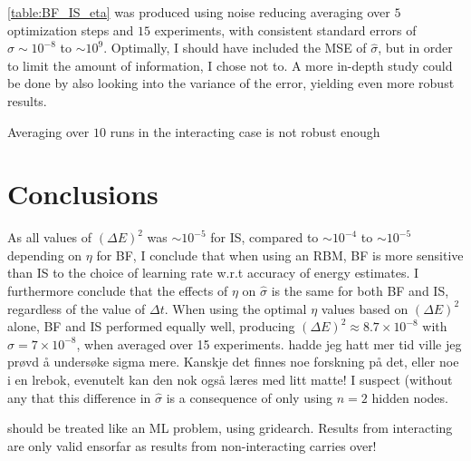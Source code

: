 \documentclass[%
oneside,                 %
final,                   %
10pt]{article}
\begin{document}
\ref{table:BF_IS_eta} was produced using noise reducing averaging over $5$ optimization steps and $15$ experiments, with consistent standard errors of $\sigma \sim 10^{-8}$ to $\sim 10^{9}$. Optimally, I should have included the MSE of $\hat \sigma$, but in order to limit the amount of information, I chose not to. A more  in-depth study could be done by also looking into the variance of the error, yielding even more robust results.

Averaging over $10$ runs in the interacting case is not robust enough 
\section{Conclusions} \label{conclusions}
As all values of $(\Delta E)^2$ was $\sim 10^{-5}$ for IS, compared to $\sim 10^{-4}$ to $\sim 10^{-5}$ depending on $\eta$ for BF, I conclude that when using an RBM, BF is more sensitive than IS to the choice of learning rate w.r.t accuracy of energy estimates. I furthermore conclude that the effects of $\eta$  on $\hat \sigma$ is the same for both BF and IS, regardless of the value of $\Delta t$. 
When using the optimal $\eta$ values based on $(\Delta E)^2$ alone, BF and IS performed equally well, producing $(\Delta E)^2 \approx 8.7 \times 10^{-8}$ with $\hat \sigma = 7 \times 10^{-8}$, when averaged over 15 experiments.
 hadde jeg hatt mer tid ville jeg prøvd å undersøke sigma mere. Kanskje det finnes noe forskning på det, eller noe i en lrebok, evenutelt kan den nok også læres med litt matte!
I suspect (without any that this difference in $\hat \sigma$ is a consequence of only using $n=2$ hidden nodes.

should be treated like an ML problem, using gridearch. Results from interacting are only valid ensorfar as results from non-interacting carries over!
 \label{refer}

\end{document}
